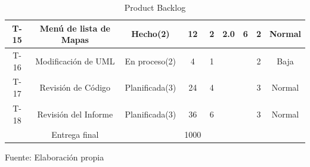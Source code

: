 \begin{landscape}
\begin{table}[t]
\begin{center}
\begin{tabular}{| c | c | c | c | c | c | c | c | c |}
				T-15 & Menú de lista de Mapas & Hecho(2) & 12 & 2 & 2.0 & 6 & 2 & Normal \\ \hline
				T-16 & Modificación de UML & En proceso(2) & 4 & 1 &  &  & 2 & Baja \\ \hline
				T-17 & Revisión de Código & Planificada(3) & 24 & 4 &  &  & 3 & Normal \\ \hline
				T-18 & Revisión del Informe & Planificada(3) & 36 & 6 &  &  & 3 & Normal \\ \hline
				& Entrega final & & 1000 &  &  &  &  &  \\ \hline
			\end{tabular}
			\caption{Product Backlog}
			\label{productbacklog}
			\footnotesize Fuente: Elaboración propia
		\end{center}
	\end{table}
\end{landscape}
\restoregeometry


\clearpage

